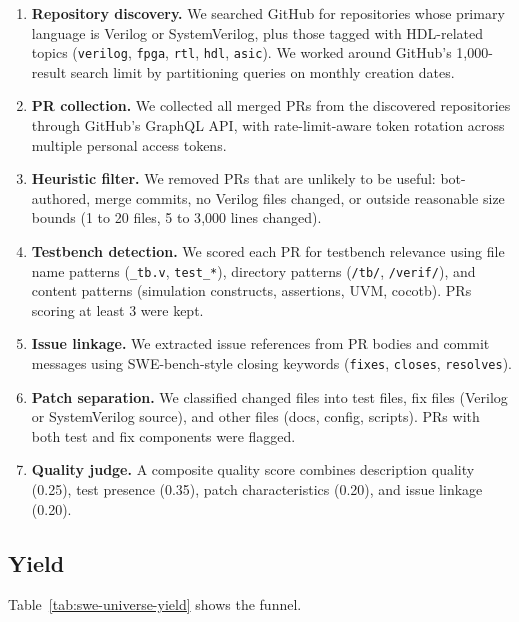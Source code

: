 \documentclass{article}
\begin{document}
\begin{enumerate}[nosep, leftmargin=*]
\item \textbf{Repository discovery.} We searched GitHub for repositories whose primary
language is Verilog or SystemVerilog, plus those tagged with HDL-related topics
(\texttt{verilog}, \texttt{fpga}, \texttt{rtl}, \texttt{hdl}, \texttt{asic}). We worked
around GitHub's 1{,}000-result search limit by partitioning queries on monthly creation
dates.

\item \textbf{PR collection.} We collected all merged PRs from the discovered repositories
through GitHub's GraphQL API, with rate-limit-aware token rotation across multiple
personal access tokens.

\item \textbf{Heuristic filter.} We removed PRs that are unlikely to be useful: bot-
authored, merge commits, no Verilog files changed, or outside reasonable size bounds (1 to
20 files, 5 to 3{,}000 lines changed).

\item \textbf{Testbench detection.} We scored each PR for testbench relevance using file
name patterns (\texttt{\_tb.v}, \texttt{test\_*}), directory patterns (\texttt{/tb/},
\texttt{/verif/}), and content patterns (simulation constructs, assertions, UVM, cocotb).
PRs scoring at least 3 were kept.

\item \textbf{Issue linkage.} We extracted issue references from PR bodies and commit
messages using SWE-bench-style closing keywords (\texttt{fixes}, \texttt{closes},
\texttt{resolves}).

\item \textbf{Patch separation.} We classified changed files into test files, fix files
(Verilog or SystemVerilog source), and other files (docs, config, scripts). PRs with both
test and fix components were flagged.

\item \textbf{Quality judge.} A composite quality score combines description quality
(0.25), test presence (0.35), patch characteristics (0.20), and issue linkage (0.20).
\end{enumerate}

\subsection{Yield}

Table~\ref{tab:swe-universe-yield} shows the funnel.
\end{document}
